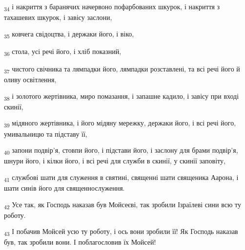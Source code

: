 \begin{tcolorbox}
\textsubscript{34} і накриття з баранячих начервоно пофарбованих шкурок, і накриття з тахашевих шкурок, і завісу заслони,
\end{tcolorbox}
\begin{tcolorbox}
\textsubscript{35} ковчега свідоцтва, і держаки його, і віко,
\end{tcolorbox}
\begin{tcolorbox}
\textsubscript{36} стола, усі речі його, і хліб показний,
\end{tcolorbox}
\begin{tcolorbox}
\textsubscript{37} чистого свічника та лямпадки його, лямпадки розставлені, та всі речі його й оливу освітлення,
\end{tcolorbox}
\begin{tcolorbox}
\textsubscript{38} і золотого жертівника, миро помазання, і запашне кадило, і завісу при вході скинії,
\end{tcolorbox}
\begin{tcolorbox}
\textsubscript{39} мідяного жертівника, і його мідяну мережку, держаки його, і всі речі його, умивальницю та підставу її,
\end{tcolorbox}
\begin{tcolorbox}
\textsubscript{40} запони подвір'я, стовпи його, і підстави його, і заслону для брами подвір'я, шнури його, і кілки його, і всі речі для служби в скинії, у скинії заповіту,
\end{tcolorbox}
\begin{tcolorbox}
\textsubscript{41} службові шати для служення в святині, священні шати священика Аарона, і шати синів його для священнослуження.
\end{tcolorbox}
\begin{tcolorbox}
\textsubscript{42} Усе так, як Господь наказав був Мойсеєві, так зробили Ізраїлеві сини всю ту роботу.
\end{tcolorbox}
\begin{tcolorbox}
\textsubscript{43} І побачив Мойсей усю ту роботу, і ось вони зробили її! Як Господь наказав був, так зробили вони. І поблагословив їх Мойсей!
\end{tcolorbox}
